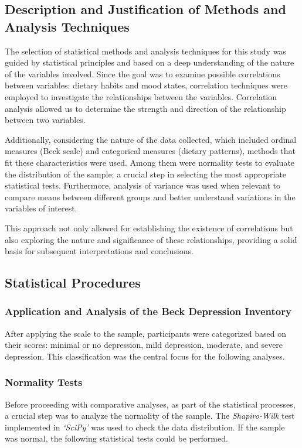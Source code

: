 \documentclass[jou]{apa7}
\begin{document}
\subsection{Description and Justification of Methods and Analysis Techniques}\label{descripciuxf3n-y-justificaciuxf3n-de-muxe9todos-y-tuxe9cnicas-de-anuxe1lisis}

The selection of statistical methods and analysis techniques for this study was guided by statistical principles and based on a deep understanding of the nature of the variables involved. Since the goal was to examine possible correlations between variables: dietary habits and mood states, correlation techniques were employed to investigate the relationships between the variables. Correlation analysis allowed us to determine the strength and direction of the relationship between two variables.

Additionally, considering the nature of the data collected, which included ordinal measures (Beck scale) and categorical measures (dietary patterns), methods that fit these characteristics were used. Among them were normality tests to evaluate the distribution of the sample; a crucial step in selecting the most appropriate statistical tests. Furthermore, analysis of variance was used when relevant to compare means between different groups and better understand variations in the variables of interest.

This approach not only allowed for establishing the existence of correlations but also exploring the nature and significance of these relationships, providing a solid basis for subsequent interpretations and conclusions.

\subsection{Statistical Procedures}\label{procedimientos-estaduxedsticos}

\subsubsection{Application and Analysis of the Beck Depression Inventory}
After applying the scale to the sample, participants were categorized based on their scores: minimal or no depression, mild depression, moderate, and severe depression. This classification was the central focus for the following analyses.

\subsubsection{Normality Tests}
Before proceeding with comparative analyses, as part of the statistical processes, a crucial step was to analyze the normality of the sample. The \emph{Shapiro-Wilk} test implemented in \emph{`SciPy'} was used to check the data distribution. If the sample was normal, the following statistical tests could be performed.
\end{document}
